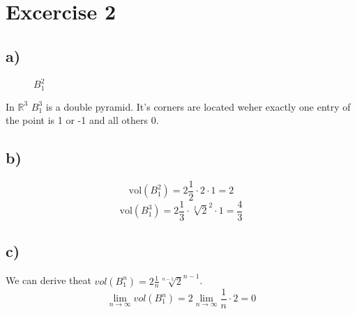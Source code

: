 \section*{Excercise 2}
\subsection*{a)}
\begin{figure}[H]
  \centering
  \caption{$B^2_1$}
\end{figure}

In $\mathbb{R}^3$ $B^3_1$ is a double pyramid.
It's corners are located weher exactly one entry of the point is 1 or -1 and all others 0.
\subsection*{b)}
\[\text{vol}(B^2_1) = 2\frac{1}{2}\cdot2\cdot1 = 2\]
\[\text{vol}(B^3_1) = 2\frac{1}{3}\cdot\sqrt[2]{2}^2\cdot1 = \frac{4}{3}\]
\subsection*{c)}
We can derive theat $vol(B^n_1) = 2\frac{1}{n}\sqrt[n-1]{2}^{n-1}$.
\[\lim_{n \to \infty} vol(B^n_1) = 2 \lim_{n \to \infty} \frac{1}{n}\cdot2 = 0\]